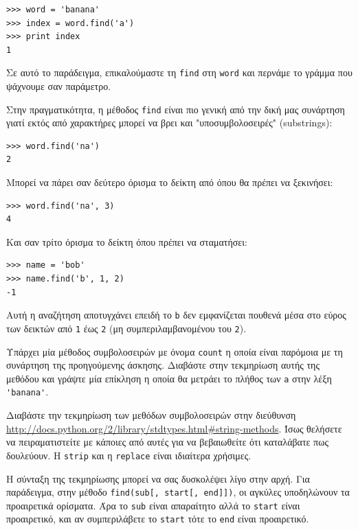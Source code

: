 \documentclass[10pt]{book}
\begin{document}
\begin{verbatim}
>>> word = 'banana'
>>> index = word.find('a')
>>> print index
1
\end{verbatim}
%

Σε αυτό το παράδειγμα, επικαλούμαστε τη {\tt find} στη {\tt word} 
και περνάμε το γράμμα που ψάχνουμε σαν παράμετρο.

Στην πραγματικότητα, η μέθοδος {\tt find} είναι πιο γενική από την δική μας συνάρτηση γιατί εκτός από χαρακτήρες μπορεί να βρει και "υποσυμβολοσειρές" (substrings):

\begin{verbatim}
>>> word.find('na')
2
\end{verbatim}
%

Μπορεί να πάρει σαν δεύτερο όρισμα το δείκτη από όπου θα πρέπει να ξεκινήσει:

\begin{verbatim}
>>> word.find('na', 3)
4
\end{verbatim}
%

Και σαν τρίτο όρισμα το δείκτη όπου πρέπει να σταματήσει:

\begin{verbatim}
>>> name = 'bob'
>>> name.find('b', 1, 2)
-1
\end{verbatim}
%

Αυτή η αναζήτηση αποτυγχάνει επειδή το {\tt b} δεν εμφανίζεται πουθενά μέσα στο
εύρος των δεικτών από {\tt 1} έως {\tt 2} (μη συμπεριλαμβανομένου του {\tt 2}).
\\

\begin{exercise}

Υπάρχει μία μέθοδος συμβολοσειρών με όνομα {\tt count} η οποία είναι παρόμοια
με τη συνάρτηση της προηγούμενης άσκησης. Διαβάστε στην τεκμηρίωση αυτής της μεθόδου και γράψτε μία επίκληση η οποία θα μετράει το πλήθος των {\tt a} στην λέξη \verb"'banana'".
\\
\end{exercise}

\begin{exercise}

Διαβάστε την τεκμηρίωση των μεθόδων συμβολοσειρών στην διεύθυνση 
\url{http://docs.python.org/2/library/stdtypes.html#string-methods}. 
Ίσως θελήσετε να πειραματιστείτε με κάποιες από αυτές για να βεβαιωθείτε ότι
καταλάβατε πως δουλεύουν. Η {\tt strip} και η {\tt replace} είναι
ιδιαίτερα χρήσιμες.

Η σύνταξη της τεκμηρίωσης μπορεί να σας δυσκολέψει λίγο στην αρχή. Για παράδειγμα, 
στην μέθοδο \verb"find(sub[, start[, end]])", οι αγκύλες υποδηλώνουν τα προαιρετικά ορίσματα.
Άρα το {\tt sub} είναι απαραίτητο αλλά το {\tt start} είναι προαιρετικό, και αν
συμπεριλάβετε το {\tt start} τότε το {\tt end} είναι προαιρετικό.
\end{exercise}
\end{document}

